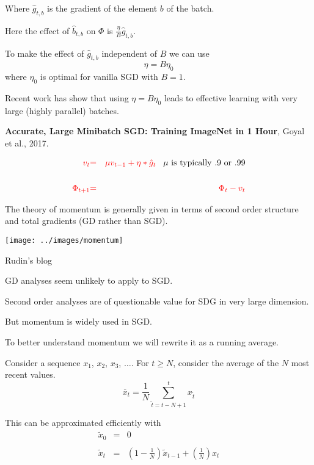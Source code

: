 {\vfill
Where $\hat{g}_{t,b}$ is the gradient of the element $b$ of the batch.

\vfill
Here the effect of $\hat{b}_{t,b}$ on $\Phi$ is $\frac{\eta}{B}\hat{g}_{t,b}$.

\vfill
To make the effect of $\hat{g}_{t,b}$ independent of $B$ we can use
{\color{red} $$\eta = B\eta_0$$}
where $\eta_0$ is optimal for vanilla SGD with $B = 1$.


Recent work has show that using $\eta = B\eta_0$ leads to effective learning with very large (highly parallel)
batches.

\vfill
{\bf Accurate, Large Minibatch SGD: Training ImageNet in 1 Hour}, Goyal et al., 2017.


\begin{eqnarray*}
  {\color{red} v_t} & {\color{red} =} & {\color{red} \mu v_{t-1} + \eta * \hat{g}_t} \;\;\;\mbox{$\mu$ is typically .9 or .99}\\
  \\
  {\color{red} \Phi_{t+1}} & {\color{red} =} & {\color{red} \Phi_t -  v_t} \\
\end{eqnarray*}

The theory of momentum is generally given in terms of second order structure and total gradients (GD rather than SGD).


\centerline{\texttt{[image: ../images/momentum]}}
\centerline{\Large Rudin's blog}



GD analyses seem unlikely to apply to SGD.

\vfill
Second order analyses are of questionable value for SDG in very large dimension.

\vfill
But momentum is widely used in SGD.

\vfill
To better understand momentum we will rewrite it as a running average.

Consider a sequence $x_1$, $x_2$, $x_3$, $\ldots$.
\vfill
For $t \geq N$, consider the average of the $N$ most recent values.
$$\overline{x}_t = \frac{1}{N} \sum_{\tilde{t} = t-N+1}^t x_{\tilde{t}}$$

\vfill
This can be approximated efficiently with
\begin{eqnarray*}
\tilde{x}_0 & = & 0 \\
\\
\tilde{x}_t & = & \left(1-\frac{1}{N}\right)\tilde{x}_{t-1} + \left(\frac{1}{N}\right)x_t
\end{eqnarray*}

}
